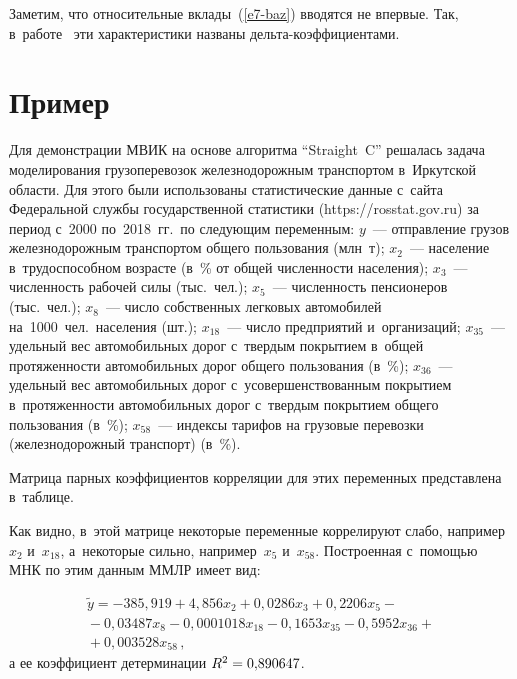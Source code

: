 \begin{multicols}{2}
  Заметим, что относительные вклады~(\ref{e7-baz}) вводятся не впервые. Так, 
в~работе~\cite{10-baz} эти характеристики названы  
дель\-та-ко\-эф\-фи\-ци\-ен\-тами.

\section{Пример}

\vspace*{-6pt}
  
  Для демонстрации МВИК на основе алгоритма ``Straight~C'' решалась задача 
моделирования грузоперевозок железнодорожным транс\-пор\-том в~Иркутской 
области. Для этого были использованы ста\-ти\-сти\-че\-ские данные с~сайта 
Федеральной службы государственной ста\-ти\-сти\-ки ({\sf https://rosstat.gov.ru}) за 
период с~2000 по~2018~гг.\ по сле\-ду\-ющим переменным: $y$~--- отправление 
грузов железнодорожным транспортом общего пользования (млн~т); 
$x_2$~--- население в~трудоспособном возрасте (в~\% от общей чис\-лен\-ности 
населения); $x_3$~--- чис\-лен\-ность рабочей силы (тыс.\ чел.); $x_5$~--- 
чис\-лен\-ность пенсионеров (тыс.\ чел.); $x_8$~--- чис\-ло собственных 
легковых автомобилей на~1000~чел.\ населения (шт.); $x_{18}$~--- чис\-ло 
предприятий и~организаций; $x_{35}$~--- удельный вес автомобильных дорог 
с~твер\-дым покрытием в~общей про\-тя\-жен\-ности автомобильных дорог общего 
пользования (в~\%); $x_{36}$~--- удельный вес автомобильных дорог 
с~усовершенствованным покрытием в~про\-тя\-жен\-ности автомобильных дорог 
с~твер\-дым покрытием общего пользования (в~\%); $x_{58}$~--- индексы 
тарифов на грузовые перевозки (железнодорожный транс\-порт) (в~\%).
  
  Матрица парных коэффициентов корреляции для этих переменных 
представлена в~таб\-лице.
  

  Как видно, в~этой мат\-ри\-це некоторые переменные коррелируют слабо, 
например~$x_2$ и~$x_{18}$, а~некоторые сильно, например~$x_5$ 
и~$x_{58}$. Построенная с~по\-мощью МНК по этим данным ММЛР имеет вид:

\vspace*{-6pt}

\noindent
  \begin{multline}
  \tilde{y}= -385{,}919+4{,}856x_2+0{,}0286 x_3+ 0{,}2206 x_5-{}\\
  {}- 0{,}03487 x_8- 0{,}0001018 x_{18} -0{,}1653 x_{35} -0{,}5952 x_{36} +{}\\
  {}+ 0{,}003528 x_{58}\,,
  \label{e8-baz}
  \end{multline}
а ее коэффициент детерминации $R^2\hm= 0{,}890647$.
  

\end{multicols}
